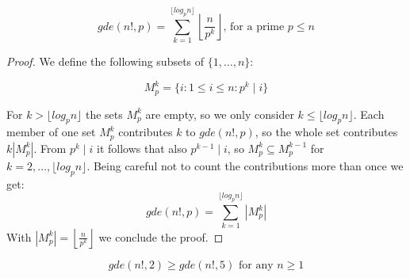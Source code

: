 \begin{lem}\label{facgde}
\begin{equation*}
gde(n!, p) = \sum_{k = 1}^{\lfloor log_p n \rfloor} \left\lfloor\frac{n}{p^k}\right\rfloor \text{, for a prime } p \leq n
\end{equation*}
\end{lem}

\begin{proof}
We define the following subsets of $\{1,\ldots,n\}$:

\begin{equation*}
M_p^k = \{i : 1 \leq i \leq n: p^k \mid i\}
\end{equation*}

For $k > \lfloor log_p n \rfloor$ the sets $M_p^k$ are empty, so we only consider $k \leq \lfloor log_p n \rfloor$. Each member of one set $M_p^k$ contributes $k$ to $gde(n!, p)$, so the whole set contributes $k | M_p^k |$.  From $p^k \mid i$ it follows that also $p^{k - 1} \mid i$, so $M_p^k \subseteq M_p^{k - 1}$ for $k = 2,\ldots,\lfloor log_p n \rfloor$. Being careful not to count the contributions more than once we get:
\begin{equation*}
gde(n!, p) = \sum_{k = 1}^{\lfloor log_p n \rfloor}  | M_p^k |
\end{equation*}
With $| M_p^k | = \left\lfloor\frac{n}{p^k}\right\rfloor$ we conclude the proof.
\end{proof}

\begin{lem}\label{gdetwo}
\begin{equation*}
gde(n!, 2) \geq gde(n!, 5) \text{ for any } n \geq 1
\end{equation*}
\end{lem}

